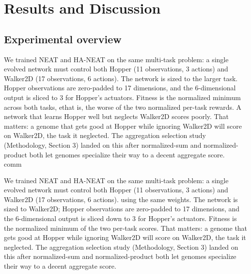 \documentclass[12pt]{article}
\begin{document}

\newpage

\section{Results and Discussion}

\subsection{Experimental overview}
We trained NEAT and HA-NEAT on the same multi-task problem: a single evolved network must control both Hopper (11 observations, 3 actions) and Walker2D (17 observations, 6 actions). The network is sized to the larger task. Hopper observations are zero-padded to 17 dimensions, and the 6-dimensional output is sliced to 3 for Hopper's actuators. Fitness is the normalized minimum across both tasks, ethat is, the worse of the two normalized per-task rewards. A network that learns Hopper well but neglects Walker2D scores poorly. That matters: a genome that gets good at Hopper while ignoring Walker2D will score on Walker2D, the task it neglected. The aggregation selection study (Methodology, Section 3) landed on this after normalized-sum and normalized-product both let genomes specialize their way to a decent aggregate score.
\\comm

We trained NEAT and HA-NEAT on the same multi-task problem: a single evolved network must control both Hopper (11 observations, 3 actions) and Walker2D (17 observations, 6 actions). using the same weights. The network is sized to Walker2D; Hopper observations are zero-padded to 17 dimensions, and the 6-dimensional output is sliced down to 3 for Hopper's actuators. Fitness is the normalized minimum of the two per-task scores. That matters: a genome that gets good at Hopper while ignoring Walker2D will score on Walker2D, the task it neglected. The aggregation selection study (Methodology, Section 3) landed on this after normalized-sum and normalized-product both let genomes specialize their way to a decent aggregate score. 
\end{document}
